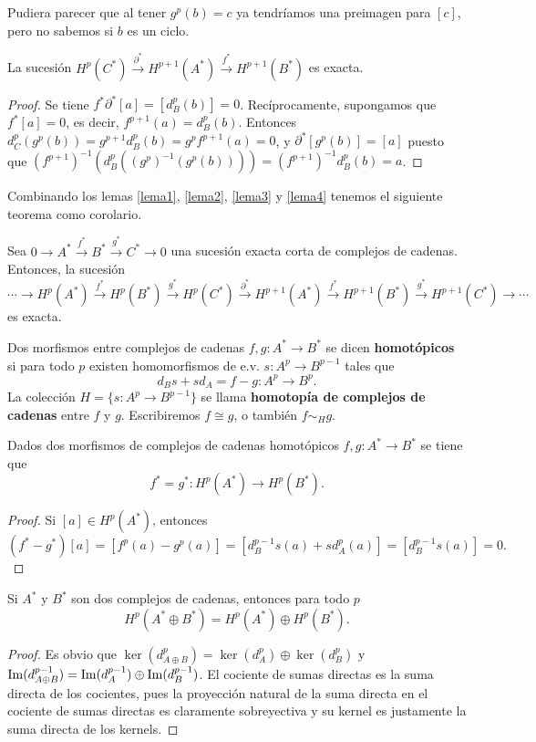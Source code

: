 \documentclass[CV.tex]{subfiles}
\begin{document}
\begin{nota}
Pudiera parecer que al tener $g^p(b)=c$ ya tendríamos una preimagen para $[c]$, pero no sabemos si $b$ es un ciclo.
\end{nota}

\begin{lemma}\label{lema4}
La sucesión $H^p(C^*)\overset{\partial^*}{\to}H^{p+1}(A^*)\overset{f^*}{\to} H^{p+1}(B^*)$ es exacta.
\end{lemma}
\begin{proof}
Se tiene $f^*\partial^*[a]=[d_B^p(b)]=0$. Recíprocamente, supongamos que $f^*[a]=0$, es decir, $f^{p+1}(a)=d_B^p(b)$. Entonces $d_C^p(g^p(b))=g^{p+1}d_B^p(b)=g^pf^{p+1}(a)=0$, y $\partial^*[g^p(b)]=[a]$ puesto que $(f^{p+1})^{-1}(d_B^p((g^p)^{-1}(g^p(b))))=(f^{p+1})^{-1}d_B^p(b)=a$.
\end{proof}

Combinando los lemas \ref{lema1}, \ref{lema2}, \ref{lema3} y \ref{lema4} tenemos el siguiente teorema como corolario.

\begin{teorema}
Sea $0\to A^*\overset{f^*}{\to}B^*\overset{g^*}{\to}C^*\to 0$ una sucesión exacta corta de complejos de cadenas. Entonces, la sucesión
\[
\cdots\to H^p(A^*)\overset{f^*}{\to}H^p(B^*)\overset{g^*}{\to}H^p(C^*)\overset{\partial^*}{\to}  H^{p+1}(A^*)\overset{f^*}{\to}H^{p+1}(B^*)\overset{g^*}{\to}H^{p+1}(C^*)\to\cdots
\]
es exacta.
\end{teorema}

\begin{defi}
Dos morfismos entre complejos de cadenas $f,g:A^*\to B^*$ se dicen \textbf{homotópicos} si para todo $p$ existen homomorfismos de e.v. $s:A^p\to B^{p-1}$
tales que
\[
d_Bs+sd_A=f-g:A^p\to B^p.
\]
La colección $H=\{s:A^p\to B^{p-1}\}$ se llama \textbf{homotopía de complejos de cadenas} entre $f$ y $g$. Escribiremos $f\cong g$, o también $f\sim_H g$.
\end{defi}

\begin{lemma}
Dados dos morfismos de complejos de cadenas homotópicos $f,g:A^*\to B^*$ se tiene que
\[
f^*=g^*:H^p(A^*)\to H^p(B^*).
\]
\end{lemma}
\begin{proof}
Si $[a]\in H^p(A^*)$, entonces
\[
(f^*-g^*)[a]=[f^p(a)-g^p(a)]=[d_B^{p-1}s(a)+sd_A^p(a)]=[d_B^{p-1}s(a)]=0.
\]
\end{proof}

\begin{lemma}
Si $A^*$ y $B^*$ son dos complejos de cadenas, entonces para todo $p$
\[
H^p(A^*\oplus B^*)=H^p(A^*)\oplus H^p(B^*).
\]
\end{lemma}
\begin{proof}
Es obvio que $\ker(d^p_{A\oplus B})=\ker(d^p_A)\oplus \ker(d^p_B)$ y $\operatorname{Im}(d^{p-1}_{A\oplus B})=\operatorname{Im}(d^{p-1}_A)\oplus \operatorname{Im}(d^{p-1}_B)$. El cociente de sumas directas es la suma directa de los cocientes, pues la proyección natural de la suma directa en el cociente de sumas directas es claramente sobreyectiva y su kernel es justamente la suma directa de los kernels.
\end{proof}
\end{document}
